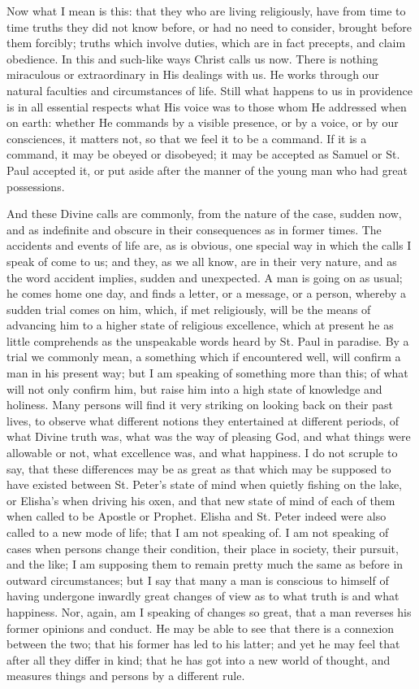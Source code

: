 Now what I mean is this: that they who are living religiously, have
from time to time truths they did not know before, or had no need to
consider, brought before them forcibly; truths which involve duties,
which are in fact precepts, and claim obedience. In this and such-like
ways Christ calls us now. There is nothing miraculous or extraordinary
in His dealings with us. He works through our natural faculties and
circumstances of life. Still what happens to us in providence is in
all essential respects what His voice was to those whom He addressed
when on earth: whether He commands by a visible presence, or by a
voice, or by our consciences, it matters not, so that we feel it to be
a command. If it is a command, it may be obeyed or disobeyed; it may
be accepted as Samuel or St. Paul accepted it, or put aside after the
manner of the young man who had great possessions.

And these Divine calls are commonly, from the nature of the case,
sudden now, and as indefinite and obscure in their consequences as in
former times. The accidents and events of life are, as is obvious, one
special way in which the calls I speak of come to us; and they, as we
all know, are in their very nature, and as the word accident implies,
sudden and unexpected. A man is going on as usual; he comes home one
day, and finds a letter, or a message, or a person, whereby a sudden
trial comes on him, which, if met religiously, will be the means of
advancing him to a higher state of religious excellence, which at
present he as little comprehends as the unspeakable words heard by St.
Paul in paradise. By a trial we commonly mean, a something which if
encountered well, will confirm a man in his present way; but I am
speaking of something more than this; of what will not only confirm
him, but raise him into a high state of knowledge and holiness. Many
persons will find it very striking on looking back on their past
lives, to observe what different notions they entertained at different
periods, of what Divine truth was, what was the way of pleasing God,
and what things were allowable or not, what excellence was, and what
happiness. I do not scruple to say, that these differences may be as
great as that which may be supposed to have existed between St.
Peter's state of mind when quietly fishing on the lake, or Elisha's
when driving his oxen, and that new state of mind of each of them when
called to be Apostle or Prophet. Elisha and St. Peter indeed were also
called to a new mode of life; that I am not speaking of. I am not
speaking of cases when persons change their condition, their place in
society, their pursuit, and the like; I am supposing them to remain
pretty much the same as before in outward circumstances; but I say
that many a man is conscious to himself of having undergone inwardly
great changes of view as to what truth is and what happiness. Nor,
again, am I speaking of changes so great, that a man reverses his
former opinions and conduct. He may be able to see that there is a
connexion between the two; that his former has led to his latter; and
yet he may feel that after all they differ in kind; that he has got
into a new world of thought, and measures things and persons by a
different rule.

